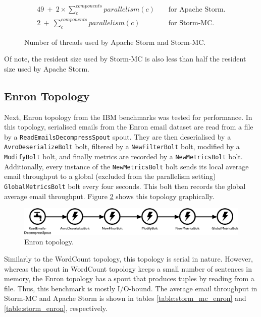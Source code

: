 \documentclass[bsc,deptreport,twoside,singlespacing,normalheadings,parskip]{infthesis}\usepackage[]{graphicx}\usepackage[]{color}
\begin{document}
\begin{figure}[!htb]
\begin{eqnarray*}
	49 \ + \ 2 \times \sum\limits_{c}^{components} parallelism(c) && \text{ for Apache Storm.} \\
	2 \ + \ \sum\limits_{c}^{components} parallelism(c) && \text{ for Storm-MC.}
\end{eqnarray*}
\caption{Number of threads used by Apache Storm and Storm-MC.}
\label{fig:formula}
\end{figure}

Of note, the resident size used by Storm-MC is also less than half the resident size used by Apache Storm.

\subsection{Enron Topology}

Next, Enron topology from the IBM benchmarks was tested for performance. In this topology, serialised emails from the Enron email dataset are read from a file by a \texttt{ReadEmailsDecompressSpout} spout. They are then deserialised by a \texttt{AvroDeserializeBolt} bolt, filtered by a \texttt{NewFilterBolt} bolt, modified by a \texttt{ModifyBolt} bolt, and finally metrics are recorded by a \texttt{NewMetricsBolt} bolt. Additionally, every instance of the \texttt{NewMetricsBolt} bolt sends its local average email throughput to a global (excluded from the parallelism setting) \texttt{GlobalMetricsBolt} bolt every four seconds. This bolt then records the global average email throughput. Figure \ref{fig:enron_topology} shows this topology graphically.

\begin{figure}[!htb]
\begin{adjustwidth}{-0.5in}{-0.5in}
	\centering
	\includegraphics[scale=0.475]{pdf/enron_topology.pdf}
	\caption{Enron topology.}
	\label{fig:enron_topology}
\end{adjustwidth}
\end{figure}

Similarly to the WordCount topology, this topology is serial in nature. However, whereas the spout in  WordCount topology keeps a small number of sentences in memory, the Enron topology has a spout that produces tuples by reading from a file. Thus, this benchmark is mostly I/O-bound. The average email throughput in Storm-MC and Apache Storm is shown in tables \ref{table:storm_mc_enron} and \ref{table:storm_enron}, respectively. 
\end{document}
